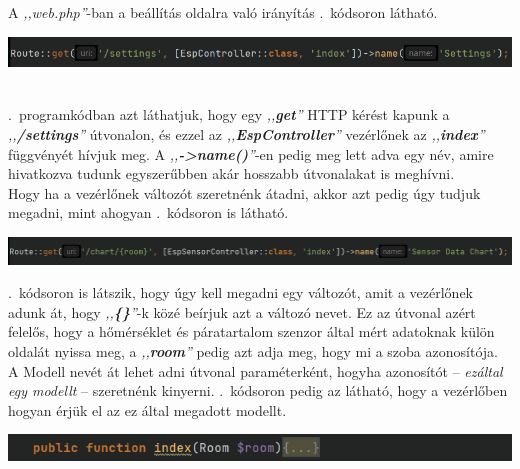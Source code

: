 \documentclass[
]{thesis-ekf}
\theoremstyle{definition}
\theoremstyle{remark}
\begin{document}
	A \emph{,,web.php''}-ban a beállítás oldalra való irányítás .~kódsoron látható.
	\\
	\begin{minipage}{1\linewidth}
		\centering
		\includegraphics[width=1\textwidth]{./src/codes/route}
		\label{settings-route}
	\end{minipage}
	\\
	.~programkódban azt láthatjuk, hogy egy \emph{,,\textbf{get}''} HTTP kérést kapunk a \emph{,,\textbf{/settings}''} útvonalon, és ezzel az \emph{,,\textbf{EspController}''} vezérlőnek az \emph{,,\textbf{index}''} függvényét hívjuk meg. A \emph{,,\textbf{->name()}''}-en pedig meg lett adva egy név, amire hivatkozva tudunk egyszerűbben akár hosszabb útvonalakat is meghívni.
	\\
	Hogy ha a vezérlőnek változót szeretnénk átadni, akkor azt pedig úgy tudjuk megadni, mint ahogyan .~kódsoron is látható.
	\\
	\begin{minipage}{1\linewidth}
		\centering
		\includegraphics[width=1\textwidth]{./src/codes/route_with_var}
		\label{chart-room-route}
	\end{minipage}
	.~kódsoron is látszik, hogy úgy kell megadni egy változót, amit a vezérlőnek adunk át, hogy \emph{,,\textbf{\{\}}''}-k közé beírjuk azt a változó nevet. Ez az útvonal azért felelős, hogy a hőmérséklet és páratartalom szenzor által mért adatoknak külön oldalát nyissa meg, a \emph{,,\textbf{room}''} pedig azt adja meg, hogy mi a szoba azonosítója. A Modell nevét át lehet adni útvonal paraméterként, hogyha azonosítót -- \emph{ezáltal egy modellt} -- szeretnénk kinyerni.\cite{laravel-route}
	.~kódsoron pedig az látható, hogy a vezérlőben hogyan érjük el az ez által megadott modellt.
	\\
	\begin{minipage}{1\linewidth}
		\centering
		\includegraphics[width=1\textwidth]{./src/codes/controller_func}
		\label{esp-sensor-cont-index}
	\end{minipage}
\end{document}
